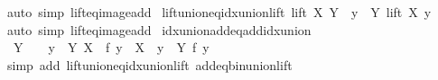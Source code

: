 \begin{isabellebody}
\endisadelimproof
%
\isatagproof
{}\isamarkupfalse%
\ {\isacharparenleft}{\kern0pt}auto\ simp{\isacharcolon}{\kern0pt}\ lift{\isacharunderscore}{\kern0pt}eq{\isacharunderscore}{\kern0pt}image{\isacharunderscore}{\kern0pt}add{\isacharparenright}{\kern0pt}%
\endisatagproof
{\isafoldproof}%
%
\isadelimproof
\isanewline
%
\endisadelimproof
\isanewline
{}\isamarkupfalse%
\ lift{\isacharunderscore}{\kern0pt}union{\isacharunderscore}{\kern0pt}eq{\isacharunderscore}{\kern0pt}idx{\isacharunderscore}{\kern0pt}union{\isacharunderscore}{\kern0pt}lift{\isacharcolon}{\kern0pt}\ {\isachardoublequoteopen}lift\ X\ {\isacharparenleft}{\kern0pt}{\isasymUnion}Y{\isacharparenright}{\kern0pt}\ {\isacharequal}{\kern0pt}\ {\isacharparenleft}{\kern0pt}{\isasymUnion}y\ {\isasymin}\ Y{\isachardot}{\kern0pt}\ lift\ X\ y{\isacharparenright}{\kern0pt}{\isachardoublequoteclose}\isanewline
%
\isadelimproof
\ \ %
\endisadelimproof
%
\isatagproof
{}\isamarkupfalse%
\ {\isacharparenleft}{\kern0pt}auto\ simp{\isacharcolon}{\kern0pt}\ lift{\isacharunderscore}{\kern0pt}eq{\isacharunderscore}{\kern0pt}image{\isacharunderscore}{\kern0pt}add{\isacharparenright}{\kern0pt}%
\endisatagproof
{\isafoldproof}%
%
\isadelimproof
\isanewline
%
\endisadelimproof
\isanewline
{}\isamarkupfalse%
\ idx{\isacharunderscore}{\kern0pt}union{\isacharunderscore}{\kern0pt}add{\isacharunderscore}{\kern0pt}eq{\isacharunderscore}{\kern0pt}add{\isacharunderscore}{\kern0pt}idx{\isacharunderscore}{\kern0pt}union{\isacharcolon}{\kern0pt}\isanewline
\ \ {\isachardoublequoteopen}Y\ {\isasymnoteq}\ {\isacharbraceleft}{\kern0pt}{\isacharbraceright}{\kern0pt}\ {\isasymLongrightarrow}\ {\isacharparenleft}{\kern0pt}{\isasymUnion}y\ {\isasymin}\ Y{\isachardot}{\kern0pt}\ X\ {\isacharplus}{\kern0pt}\ f\ y{\isacharparenright}{\kern0pt}\ {\isacharequal}{\kern0pt}\ X\ {\isacharplus}{\kern0pt}\ {\isacharparenleft}{\kern0pt}{\isasymUnion}y\ {\isasymin}\ Y{\isachardot}{\kern0pt}\ f\ y{\isacharparenright}{\kern0pt}{\isachardoublequoteclose}\isanewline
%
\isadelimproof
\ \ %
\endisadelimproof
%
\isatagproof
{}\isamarkupfalse%
\ {\isacharparenleft}{\kern0pt}simp\ add{\isacharcolon}{\kern0pt}\ lift{\isacharunderscore}{\kern0pt}union{\isacharunderscore}{\kern0pt}eq{\isacharunderscore}{\kern0pt}idx{\isacharunderscore}{\kern0pt}union{\isacharunderscore}{\kern0pt}lift\ add{\isacharunderscore}{\kern0pt}eq{\isacharunderscore}{\kern0pt}bin{\isacharunderscore}{\kern0pt}union{\isacharunderscore}{\kern0pt}lift{\isacharparenright}{\kern0pt}%
\endisatagproof
{\isafoldproof}%
%
\isadelimproof

\end{isabellebody}

